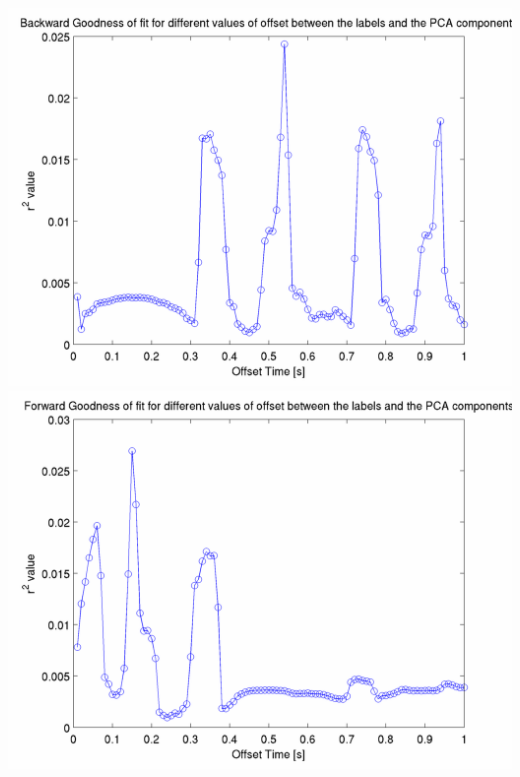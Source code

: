\documentclass[12pt]{article}
\begin{document}
\includegraphics[scale=0.2]{pca_regression_r_value_forward.png}
\includegraphics[scale=0.2]{pca_regression_r_value_backward.png}
\end{document}

